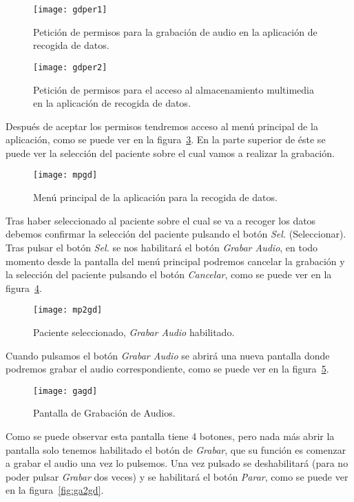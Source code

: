 \begin{figure}[htb]
	\centering
	\texttt{[image: gdper1]}
	\caption{Petición de permisos para la grabación de audio en la aplicación de recogida de datos.}
	\label{fig:gdper1}
\end{figure}

\begin{figure}[H]
	\centering
	\texttt{[image: gdper2]}
	\caption{Petición de permisos para el acceso al almacenamiento multimedia en la aplicación de recogida de datos.}
	\label{fig:gdper2}
\end{figure}

Después de aceptar los permisos tendremos acceso al menú principal de la aplicación, como se puede ver en la figura~\ref{fig:mpgd}. En la parte superior de éste se puede ver la selección del paciente sobre el cual vamos a realizar la grabación.

\begin{figure}[h]
	\centering
	\texttt{[image: mpgd]}
	\caption{Menú principal de la aplicación para la recogida de datos.}
	\label{fig:mpgd}
\end{figure}

Tras haber seleccionado al paciente sobre el cual se va a recoger los datos debemos confirmar la selección del paciente pulsando el botón \textit{Sel.} (Seleccionar). Tras pulsar el botón \textit{Sel.} se nos habilitará el botón \textit{Grabar Audio}, en todo momento desde la pantalla del menú principal podremos cancelar la grabación y la selección del paciente pulsando el botón \textit{Cancelar}, como se puede ver en la figura~\ref{fig:mp2gd}.

\begin{figure}[H]
	\centering
	\texttt{[image: mp2gd]}
	\caption{Paciente seleccionado, \textit{Grabar Audio} habilitado.}
	\label{fig:mp2gd}
\end{figure}

Cuando pulsamos el botón \textit{Grabar Audio} se abrirá una nueva pantalla donde podremos grabar el audio correspondiente, como se puede ver en la figura~\ref{fig:gagd}.

\begin{figure}[H]
	\centering
	\texttt{[image: gagd]}
	\caption{Pantalla de Grabación de Audios.}
	\label{fig:gagd}
\end{figure}

Como se puede observar esta pantalla tiene 4 botones, pero nada más abrir la pantalla solo tenemos habilitado el botón de \textit{Grabar}, que su función es comenzar a grabar el audio una vez lo pulsemos. Una vez pulsado se deshabilitará (para no poder pulsar \textit{Grabar} dos veces) y se habilitará el botón \textit{Parar}, como se puede ver en la figura~\ref{fig:ga2gd}.


